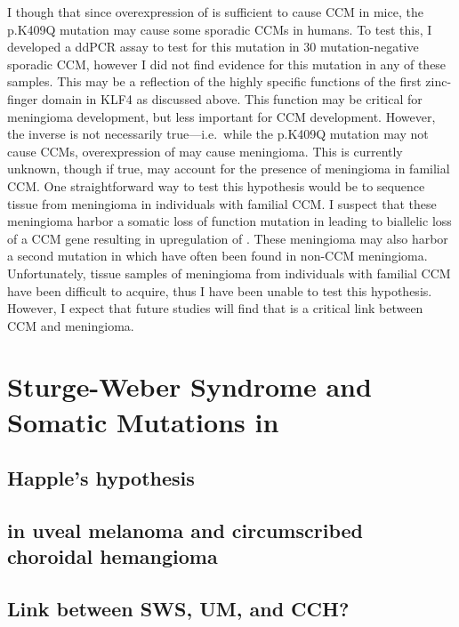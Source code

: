 I though that since overexpression of  is sufficient to cause CCM in mice, the p.K409Q mutation may cause some sporadic CCMs in humans. To test this, I developed a ddPCR assay to test for this mutation in 30 mutation-negative sporadic CCM, however I did not find evidence for this mutation in any of these samples. This may be a reflection of the highly specific functions of the first zinc-finger domain in KLF4 as discussed above. This function may be critical for meningioma development, but less important for CCM development. However, the inverse is not necessarily true---i.e.~while the p.K409Q mutation may not cause CCMs, overexpression of  may cause meningioma. This is currently unknown, though if true, may account for the presence of meningioma in familial CCM. One straightforward way to test this hypothesis would be to sequence tissue from meningioma in individuals with familial CCM. I suspect that these meningioma harbor a somatic loss of function mutation in  leading to biallelic loss of a CCM gene resulting in upregulation of . These meningioma may also harbor a second mutation in  which have often been found in non-CCM meningioma. Unfortunately, tissue samples of meningioma from individuals with familial CCM have been difficult to acquire, thus I have been unable to test this hypothesis. However, I expect that future studies will find that  is a critical link between CCM and meningioma. 










\section{Sturge-Weber Syndrome and Somatic Mutations in }
\subsection{Happle's hypothesis}
\subsection{ in uveal melanoma and circumscribed choroidal hemangioma}
\subsection{Link between SWS, UM, and CCH?}








